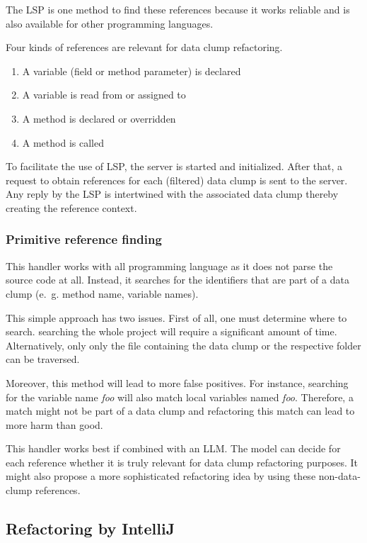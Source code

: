 The \ac{LSP} is one method to find these references because it works reliable and is also available for other programming languages.

Four kinds of references are relevant for data clump refactoring.

\begin{enumerate}
     \item A  variable (field or method parameter)  is declared
    \item A variable is read from or assigned to
   
    \item A method is declared or overridden
    \item A method is called
\end{enumerate}
To facilitate the use of \ac{LSP}, the server is started and initialized. After that, a request to obtain references for each (filtered) data clump is sent to the server.
Any reply by the \ac{LSP} is intertwined with the associated data clump thereby creating the reference context.

 
\subsubsection{Primitive reference finding}
This handler works with all programming language as it does not parse the source code at all. Instead, it searches for the identifiers that are part of a data clump (e.~g. method name, variable names). 

This simple approach has two issues. First of all, one must determine where to search. searching the whole project will require a significant amount of time. Alternatively, only only the file containing the data clump or the respective folder can be traversed.

Moreover, this method will lead to more false positives. For instance, searching for the variable name \textit{foo} will also match local variables named \textit{foo}. Therefore, a match might not be part of a data clump and refactoring this match can lead to more harm than good. 

This handler works best if combined with an \ac{LLM}. The model can decide for each reference whether it is truly relevant for data clump refactoring purposes. It might also propose a more sophisticated refactoring idea by using these non-data-clump references. 

\subsection{Refactoring by IntelliJ} \label{sec:intellij_refactoring}

